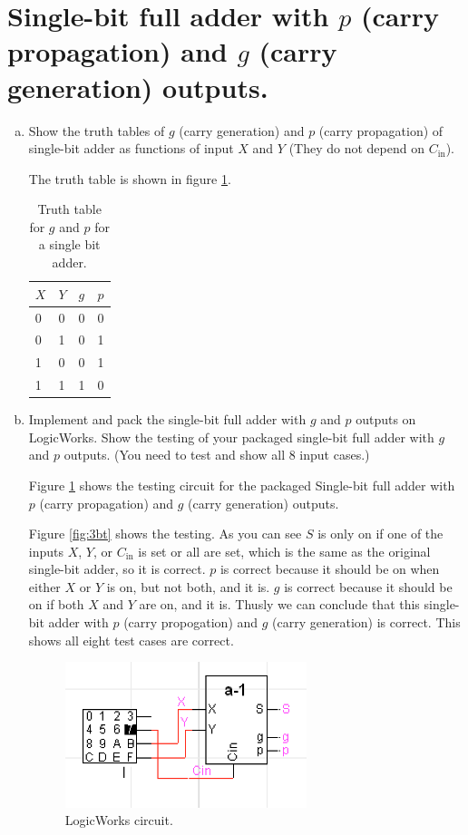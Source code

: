 \documentclass[11pt]{article}
\begin{document}
\section{Single-bit full adder with $p$ (carry propagation) and $g$ (carry generation) outputs.}

\begin{enumerate}[(a)]
	\item{
	Show the truth tables of $g$ (carry generation) and $p$ (carry propagation) of single-bit adder as functions of input $X$ and $Y$ (They do not depend on $C_{\text{in}}$).

		The truth table is shown in figure \ref{fig:3a}.

		\begin{table}[h]
		\centering
		\begin{tabular}{llll}
			$X$ & $Y$ & $g$ & $p$ \\ \hline
			0 & 0 & 0 & 0 \\
			0 & 1 & 0 & 1 \\
			1 & 0 & 0 & 1 \\
			1 & 1 & 1 & 0 \\
		\end{tabular}
		\caption{\label{fig:3a} Truth table for $g$ and $p$ for a single bit adder.}
		\end{table}
	}
	\item{
		Implement and pack the single-bit full adder with $g$ and $p$ outputs on LogicWorks. Show the testing of your packaged single-bit full adder with $g$ and $p$ outputs. (You need to test and show all 8 input cases.)

		Figure \ref{fig:3bc} shows the testing circuit for the packaged Single-bit full adder with $p$ (carry propagation) and $g$ (carry generation) outputs.

		Figure \ref{fig:3bt} shows the testing. As you can see $S$ is only on if one of the inputs $X$, $Y$, or $C_{\text{in}}$ is set or all are set, which is the same as the original single-bit adder, so it is correct. $p$ is correct because it should be on when either $X$ or $Y$ is on, but not both, and it is. $g$ is correct because it should be on if both $X$ and $Y$ are on, and it is. Thusly we can conclude that this single-bit adder with $p$ (carry propogation) and $g$ (carry generation) is correct. This shows all eight test cases are correct.

		\begin{figure}[h]
			\centering
			\includegraphics[width=200pt]{3pc}
			\caption{\label{fig:3bc} LogicWorks circuit.}
		\end{figure}

}
\end{enumerate}
\end{document}
